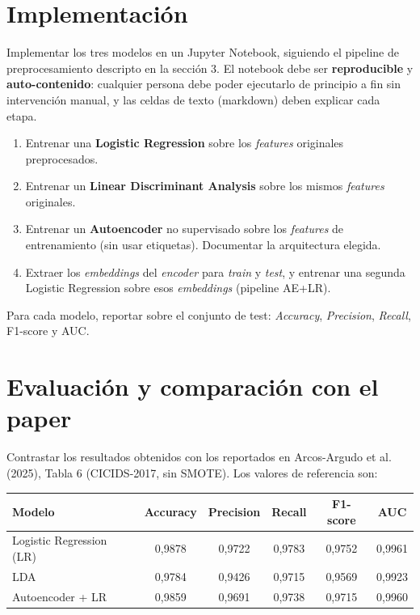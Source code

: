 \documentclass[11pt,a4paper]{article}
\begin{document}
\section{Implementaci\'on}
Implementar los tres modelos en un Jupyter Notebook, siguiendo el pipeline de preprocesamiento descripto en la secci\'on 3. El notebook debe ser \textbf{reproducible} y \textbf{auto-contenido}: cualquier persona debe poder ejecutarlo de principio a fin sin intervenci\'on manual, y las celdas de texto (markdown) deben explicar cada etapa.

\begin{enumerate}[leftmargin=2em,itemsep=2pt]
    \item Entrenar una \textbf{Logistic Regression} sobre los \textit{features} originales preprocesados.
    \item Entrenar un \textbf{Linear Discriminant Analysis} sobre los mismos \textit{features} originales.
    \item Entrenar un \textbf{Autoencoder} no supervisado sobre los \textit{features} de entrenamiento (sin usar etiquetas). Documentar la arquitectura elegida.
    \item Extraer los \textit{embeddings} del \textit{encoder} para \textit{train} y \textit{test}, y entrenar una segunda Logistic Regression sobre esos \textit{embeddings} (pipeline AE+LR).
\end{enumerate}
Para cada modelo, reportar sobre el conjunto de test: \textit{Accuracy}, \textit{Precision}, \textit{Recall}, F1-score y AUC.

\section{Evaluaci\'on y comparaci\'on con el paper}
Contrastar los resultados obtenidos con los reportados en Arcos-Argudo et al. (2025), Tabla 6 (CICIDS-2017, sin SMOTE). Los valores de referencia son:

\begin{center}
\begin{tabular}{lccccc}
        \toprule
        \textbf{Modelo} & \textbf{Accuracy} & \textbf{Precision} & \textbf{Recall} & \textbf{F1-score} & \textbf{AUC} \\
        \midrule
        Logistic Regression (LR) & 0,9878 & 0,9722 & 0,9783 & 0,9752 & 0,9961 \\
        LDA & 0,9784 & 0,9426 & 0,9715 & 0,9569 & 0,9923 \\
        Autoencoder + LR & 0,9859 & 0,9691 & 0,9738 & 0,9715 & 0,9960 \\
        \bottomrule
\end{tabular}
\end{center}
\end{document}
